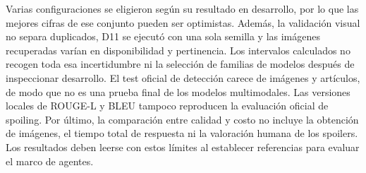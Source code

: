 Varias configuraciones se eligieron según su resultado en desarrollo, por
lo que las mejores cifras de ese conjunto pueden ser optimistas. Además,
la validación visual no separa duplicados, D11 se ejecutó con una sola
semilla y las imágenes recuperadas varían en disponibilidad y pertinencia.
Los intervalos calculados no recogen toda esa incertidumbre ni la selección
de familias de modelos después de inspeccionar desarrollo. El test oficial
de detección carece de imágenes y artículos, de modo que no es una prueba
final de los modelos multimodales. Las versiones
locales de ROUGE-L y BLEU tampoco reproducen la evaluación oficial de
spoiling. Por último, la comparación entre calidad y costo no incluye
la obtención de imágenes, el tiempo total de respuesta ni la valoración
humana de los spoilers. Los resultados deben leerse con estos límites
al establecer referencias para evaluar el marco de agentes.
